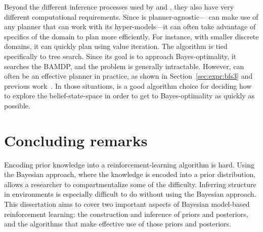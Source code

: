 Beyond the different inference processes used by  and , they also have very different computational requirements. Since  is planner-agnostic--- can make use of any planner that can work with its hyper-models---it can often take advantage of specifics of the domain to plan more efficiently. For instance, with smaller discrete domains, it can quickly plan using value iteration. The  algorithm is tied specifically to tree search. Since its goal is to approach Bayes-optimality, it searches the BAMDP, and the problem is generally intractable. However,  can often be an effective planner in practice, as shown in Section~\ref{sec:expr:bfs3} and previous work~\cite{walsh10}. In those situations,  is a good algorithm choice for deciding how to explore the belief-state-space in order to get to Bayes-optimality as quickly as possible.

\section{Concluding remarks}

Encoding prior knowledge into a reinforcement-learning algorithm is hard. Using the Bayesian approach, where the knowledge is encoded into a prior distribution, allows a researcher to compartmentalize some of the difficulty. Inferring structure in environments is especially difficult to do without using the Bayesian approach. This dissertation aims to cover two important aspects of Bayesian model-based reinforcement learning: the construction and inference of priors and posteriors, and the algorithms that make effective use of those priors and posteriors.

